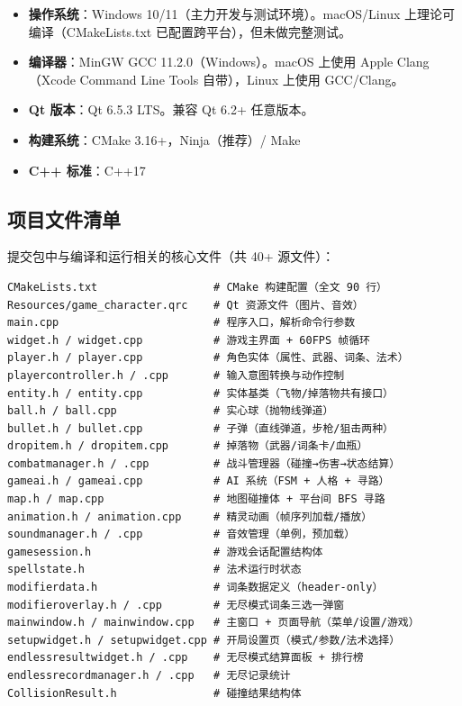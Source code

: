 \documentclass[utf8]{ctexart}
\begin{document}
\begin{itemize}
  \item \textbf{操作系统}：Windows 10/11（主力开发与测试环境）。macOS/Linux 上理论可编译（CMakeLists.txt 已配置跨平台），但未做完整测试。
  \item \textbf{编译器}：MinGW GCC 11.2.0（Windows）。macOS 上使用 Apple Clang（Xcode Command Line Tools 自带），Linux 上使用 GCC/Clang。
  \item \textbf{Qt 版本}：Qt 6.5.3 LTS。兼容 Qt 6.2+ 任意版本。
  \item \textbf{构建系统}：CMake 3.16+，Ninja（推荐）/ Make
  \item \textbf{C++ 标准}：C++17
\end{itemize}

\subsection{项目文件清单}

提交包中与编译和运行相关的核心文件（共 40+ 源文件）：

\begin{verbatim}
CMakeLists.txt                  # CMake 构建配置（全文 90 行）
Resources/game_character.qrc    # Qt 资源文件（图片、音效）
main.cpp                        # 程序入口，解析命令行参数
widget.h / widget.cpp           # 游戏主界面 + 60FPS 帧循环
player.h / player.cpp           # 角色实体（属性、武器、词条、法术）
playercontroller.h / .cpp       # 输入意图转换与动作控制
entity.h / entity.cpp           # 实体基类（飞物/掉落物共有接口）
ball.h / ball.cpp               # 实心球（抛物线弹道）
bullet.h / bullet.cpp           # 子弹（直线弹道，步枪/狙击两种）
dropitem.h / dropitem.cpp       # 掉落物（武器/词条卡/血瓶）
combatmanager.h / .cpp          # 战斗管理器（碰撞→伤害→状态结算）
gameai.h / gameai.cpp           # AI 系统（FSM + 人格 + 寻路）
map.h / map.cpp                 # 地图碰撞体 + 平台间 BFS 寻路
animation.h / animation.cpp     # 精灵动画（帧序列加载/播放）
soundmanager.h / .cpp           # 音效管理（单例，预加载）
gamesession.h                   # 游戏会话配置结构体
spellstate.h                    # 法术运行时状态
modifierdata.h                  # 词条数据定义（header-only）
modifieroverlay.h / .cpp        # 无尽模式词条三选一弹窗
mainwindow.h / mainwindow.cpp   # 主窗口 + 页面导航（菜单/设置/游戏）
setupwidget.h / setupwidget.cpp # 开局设置页（模式/参数/法术选择）
endlessresultwidget.h / .cpp    # 无尽模式结算面板 + 排行榜
endlessrecordmanager.h / .cpp   # 无尽记录统计
CollisionResult.h               # 碰撞结果结构体
\end{verbatim}
\end{document}
